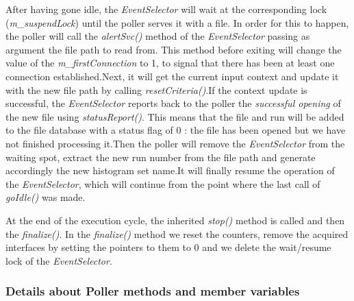 After having gone idle, the \textit{EventSelector} will wait at the corresponding lock (\textit{m\_suspendLock}) until the poller serves it with a file. In order for this to happen, the poller will call the \textit{alertSvc()} method of the \textit{EventSelector} passing as argument the file path to read from. This method before exiting will change the value of the \textit{m\_firstConnection} to 1, to signal that there has been at least one connection established.Next, it will get the current input context and update it with the new file path by calling \textit{resetCriteria()}.If the context update is successful, the \textit{EventSelector} reports back to the poller the \textit{successful opening} of the new file using \textit{statusReport()}. This means that the file and run will be added to the file database with a status flag of 0 : the file has been opened but we have not finished processing it.Then the poller will remove the \textit{EventSelector} from the waiting spot, extract the new run number from the file path and generate accordingly the new histogram set name.It will finally resume the operation of the \textit{EventSelector}, which will continue from the point where the last call of \textit{goIdle()} was made.\par
At the end of the execution cycle, the inherited \textit{stop()} method is called and then the \textit{finalize()}. In the \textit{finalize()} method we reset the counters, remove the acquired interfaces by setting the pointers to them to 0 and we delete the wait/resume lock of the \textit{EventSelector}.

\subsubsection{\textbf{Details about Poller methods and member variables}}

